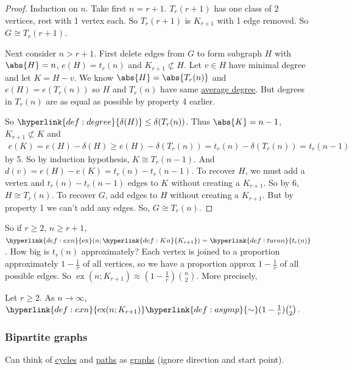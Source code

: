 \documentclass{article}
\DeclareMathOperator{\ext}{ex}
\begin{document}
\begin{proof}
    Induction on $n$.
    Take first $n = r+1$. $T_r(r+1)$ has one class of 2 vertices, rest with 1 vertex each. So $T_r(r+1)$ is $K_{r+1}$ with 1 edge removed. So $G \cong T_r(r+1)$.

    Next consider $n > r+1$. First delete edges from $G$ to form subgraph $H$ with $\abs{H} = n$, $e(H) = t_r(n)$ and $K_{r+1} \not \subset H$. Let $v \in H$ have minimal degree and let $K = H- v$.
    We know $\abs{H} = \abs{T_r(n)}$ and $e(H) = e(T_r(n))$ so $H$ and $T_r(n)$ have same \hyperlink{def:degree}{average degree}. But degrees in $T_r(n)$ are as equal as possible by property 4 earlier.

    So $\hyperlink{def:degree}{\delta(H)} \leq \delta(T_r(n))$. Thus $\abs{K} = n-1$, $K_{r+1} \not\subset K$ and \begin{align*}e(K) = e(H) - \delta (H) \geq e(H) - \delta(T_r(n)) = t_r(n) - \delta(T_r(n)) = t_r(n-1)\end{align*} by 5.
    So by induction hypothesis, $K \cong T_r(n-1)$. And $d(v) = e(H) - e(K) = t_r(n) - t_r(n-1)$.
    To recover $H$, we must add a vertex and $t_r(n) - t_r(n-1)$ edges to $K$ without creating a $K_{r+1}$. So by 6, $H \cong T_r(n)$.
    To recover $G$, add edges to $H$ without creating a $K_{r+1}$. But by property 1 we can't add any edges. So, $G \cong T_r(n)$.
\end{proof}

So if $r \geq 2$, $n \geq r+1$, $\hyperlink{def:exn}{\ext}(n; \hyperlink{def:Kn}{K_{r+1}}) = \hyperlink{def:turan}{t_r(n)}$.
How big is $t_r(n)$ approximately?
Each vertex is joined to a proportion approximately $1 - \frac{1}{r}$ of all vertices, so we have a proportion approx $1 - \frac{1}{r}$ of all possible edges. So $\ext(n; K_{r+1}) \approx (1-\frac{1}{r}) \binom{n}{2}$.
More precisely,

\begin{ncor}\label{cor:10}
    Let $r \geq 2$. As $n \to \infty$, $\hyperlink{def:exn}{\ext(n; K_{r+1})} \hyperlink{def:asymp}{\sim} (1 - \frac{1}{r}) \binom{r}{2}$.
\end{ncor}

\subsubsection{Bipartite graphs}
Can think of \hyperlink{def:cycle}{cycles} and \hyperlink{def:path}{paths} as \hyperlink{def:graph}{graphs} (ignore direction and start point).
\end{document}
